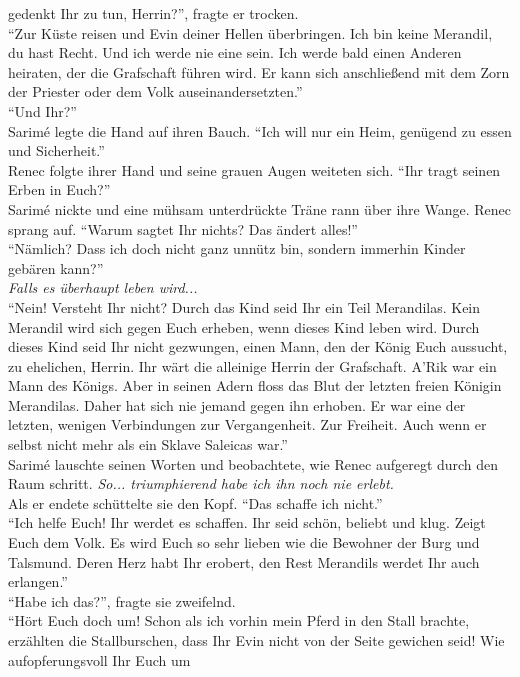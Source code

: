 gedenkt Ihr zu tun, Herrin?'', fragte er trocken.\\
``Zur Küste reisen und Evin deiner Hellen überbringen. Ich bin keine Merandil, du hast Recht. Und 
ich werde nie eine sein. Ich werde bald einen Anderen heiraten, der die Grafschaft führen wird. Er 
kann sich anschließend mit dem Zorn der Priester oder dem Volk auseinandersetzten.''\\
``Und Ihr?''\\
Sarimé legte die Hand auf ihren Bauch. ``Ich will nur ein Heim, genügend zu essen und 
Sicherheit.''\\
Renec folgte ihrer Hand und seine grauen Augen weiteten sich. ``Ihr tragt seinen Erben in Euch?''\\
Sarimé nickte und eine mühsam unterdrückte Träne rann über ihre Wange. Renec sprang auf. ``Warum 
sagtet Ihr nichts? Das ändert alles!''\\
``Nämlich? Dass ich doch nicht ganz unnütz bin, sondern immerhin Kinder gebären kann?''\\
\textit{Falls es überhaupt leben wird...}\\
``Nein! Versteht Ihr nicht? Durch das Kind seid Ihr ein Teil Merandilas. Kein Merandil wird sich 
gegen Euch erheben, wenn dieses Kind leben wird. Durch dieses Kind seid Ihr nicht gezwungen, einen 
Mann, den der König Euch aussucht, zu ehelichen, Herrin. Ihr wärt die alleinige Herrin der 
Grafschaft. A'Rik war ein Mann des Königs. Aber in seinen Adern floss das Blut der letzten freien 
Königin Merandilas. Daher hat sich nie jemand gegen ihn erhoben. Er war eine der letzten, wenigen 
Verbindungen zur Vergangenheit. Zur Freiheit. Auch wenn er selbst nicht mehr als ein Sklave 
Saleicas war.''\\
Sarimé lauschte seinen Worten und beobachtete, wie Renec aufgeregt durch den Raum schritt. 
\textit{So... triumphierend habe ich ihn noch nie erlebt.}\\
Als er endete schüttelte sie den Kopf. ``Das schaffe ich nicht.''\\
``Ich helfe Euch! Ihr werdet es schaffen. Ihr seid schön, beliebt und klug. Zeigt Euch dem Volk. Es 
wird Euch so sehr lieben wie die Bewohner der Burg und Talsmund. Deren Herz habt Ihr erobert, den 
Rest Merandils werdet Ihr auch erlangen.''\\
``Habe ich das?'', fragte sie zweifelnd.\\
``Hört Euch doch um! Schon als ich vorhin mein Pferd in den Stall brachte, erzählten die 
Stallburschen, dass Ihr Evin nicht von der Seite gewichen seid! Wie aufopferungsvoll Ihr Euch um 
